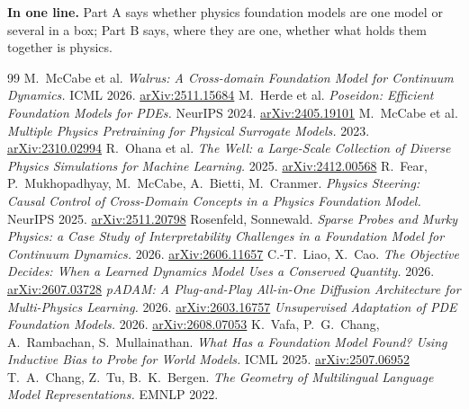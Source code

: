 \documentclass[11pt,a4paper]{article}
\begin{document}
\vspace{0.8em}
\begin{keybox}
\textbf{In one line.} Part A says whether physics foundation models are one model or several in a box;
Part B says, where they are one, whether what holds them together is physics.
\end{keybox}

\vspace{1.5em}
\begin{thebibliography}{99}
\setlength{\itemsep}{0.5em}
\small
{} M.~McCabe et al. \emph{Walrus: A Cross-domain Foundation Model for Continuum Dynamics.} ICML 2026. \href{https://arxiv.org/abs/2511.15684}{arXiv:2511.15684}
 M.~Herde et al. \emph{Poseidon: Efficient Foundation Models for PDEs.} NeurIPS 2024. \href{https://arxiv.org/abs/2405.19101}{arXiv:2405.19101}
 M.~McCabe et al. \emph{Multiple Physics Pretraining for Physical Surrogate Models.} 2023. \href{https://arxiv.org/abs/2310.02994}{arXiv:2310.02994}
 R.~Ohana et al. \emph{The Well: a Large-Scale Collection of Diverse Physics Simulations for Machine Learning.} 2025. \href{https://arxiv.org/abs/2412.00568}{arXiv:2412.00568}
 R.~Fear, P.~Mukhopadhyay, M.~McCabe, A.~Bietti, M.~Cranmer. \emph{Physics Steering: Causal Control of Cross-Domain Concepts in a Physics Foundation Model.} NeurIPS 2025. \href{https://arxiv.org/abs/2511.20798}{arXiv:2511.20798}
 Rosenfeld, Sonnewald. \emph{Sparse Probes and Murky Physics: a Case Study of Interpretability Challenges in a Foundation Model for Continuum Dynamics.} 2026. \href{https://arxiv.org/abs/2606.11657}{arXiv:2606.11657}
 C.-T.~Liao, X.~Cao. \emph{The Objective Decides: When a Learned Dynamics Model Uses a Conserved Quantity.} 2026. \href{https://arxiv.org/abs/2607.03728}{arXiv:2607.03728}
 \emph{pADAM: A Plug-and-Play All-in-One Diffusion Architecture for Multi-Physics Learning.} 2026. \href{https://arxiv.org/abs/2603.16757}{arXiv:2603.16757}
 \emph{Unsupervised Adaptation of PDE Foundation Models.} 2026. \href{https://arxiv.org/abs/2608.07053}{arXiv:2608.07053}
 K.~Vafa, P.~G.~Chang, A.~Rambachan, S.~Mullainathan. \emph{What Has a Foundation Model Found? Using Inductive Bias to Probe for World Models.} ICML 2025. \href{https://arxiv.org/abs/2507.06952}{arXiv:2507.06952}
 T.~A.~Chang, Z.~Tu, B.~K.~Bergen. \emph{The Geometry of Multilingual Language Model Representations.} EMNLP 2022.

\end{thebibliography}
\end{document}
